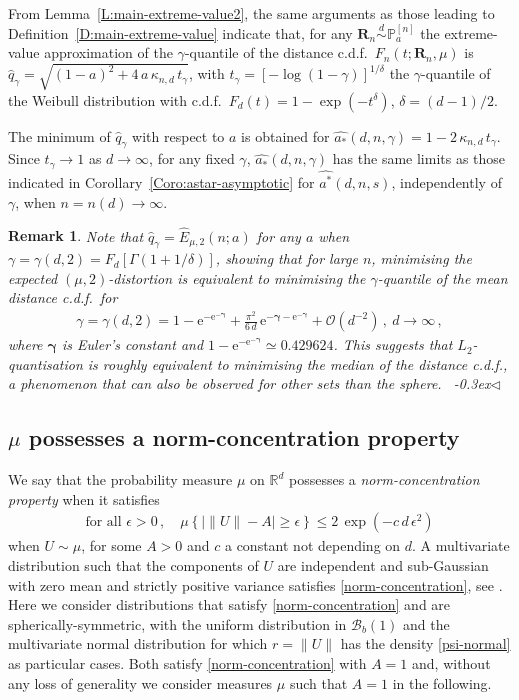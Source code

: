 \documentclass{article}
\def\mgbb{{\boldsymbol{\gamma}}}
\def\RR{\mathds{R}}
\def\simd{\stackrel{d}{\sim}}
\def\me{\epsilon}
\newcommand{\vsp} {\vspace{0.3cm}}
\def\PP{\mathbb{P}}
\def\SB{{\mathscr B}}
\newcommand{\bea}{\begin{eqnarray*}}
\newcommand{\eea}{\end{eqnarray*}}
\newcommand{\be}{\begin{eqnarray}}
\newcommand{\ee}{\end{eqnarray}}
\def\Rb{\mathbf{R}}
\def\mg{\gamma}
\def\e1{\mathrm{e}}
\newcommand{\fin} {\mbox{}~\hfill{\lower-0.3ex\hbox{$\triangleleft$}}}
\def\SO{{\mathcal O}}
\newtheorem{remark}{Remark}[section]
\begin{document}
\vsp
From Lemma~\ref{L:main-extreme-value2}, the same arguments as those leading to Definition~\ref{D:main-extreme-value} indicate that, for any $\Rb_n\simd \PP_a^{[n]}$ the extreme-value approximation of the $\mg$-quantile of the  distance c.d.f.\ $F_n(t; \Rb_n,\mu)$ is $\widehat q_\mg = \sqrt{(1-a)^2+4\,a\,\kappa_{n,d}\,t_\mg}$, with $t_\mg=[-\log(1-\mg)]^{1/\delta}$ the $\mg$-quantile of the Weibull distribution with c.d.f.\ $F_d(t)=1-\exp(-t^\delta)$, $\delta=(d-1)/2$.

The minimum of $\widehat q_\mg$ with respect to $a$ is obtained for $\widehat {a_*}(d,n,\mg)=1-2\,\kappa_{n,d}\,t_\mg$. Since $t_\mg\to 1$ as $d\to\infty$, for any fixed $\mg$, $\widehat {a_*}(d,n,\mg)$ has the same limits as those indicated in Corollary~\ref{Coro:astar-asymptotic} for $\widehat {a^*}(d,n,s)$, independently of $\mg$, when $n = n(d) \to \infty.$

\begin{remark}\label{R:quantiles} Note that $\widehat q_\mg = \widehat E_{\mu,2}(n;a)$ for any $a$ when $\mg=\mg(d,2)=F_d[\Gamma(1+1/\delta)]$, showing that for large $n$, minimising the expected $(\mu,2)$-distortion is equivalent to minimising the $\mg$-quantile of the mean distance c.d.f.\ for
\bea
\mg=\mg(d,2)=1- \e1^{-\e1^{-\mgbb}} + \frac{\pi^2}{6\,d}\, \e1^{-\mgbb-\e1^{-\mgbb}} +\SO(d^{-2})  \,, \ d\to\infty\,,
\eea
where $\mgbb$ is Euler's constant and $1- \e1^{-\e1^{-\mgbb}}\simeq 0.429624$. This suggests that $L_2$-quantisation is roughly equivalent to minimising the median of the distance c.d.f., a phenomenon that can also be observed for other sets than the sphere.
\fin
\end{remark}

\subsection{$\mu$ possesses a norm-concentration property} \label{S:extreme-value-general-mu}

We say that the probability measure  $\mu$ on $\RR^d$ possesses a {\em norm-concentration property} when it satisfies
\be\label{norm-concentration}
\mbox{for all } \me>0\,, \quad \mu\left\{\left| \|U\|-A \right| \geq \me\right\} \leq 2\,\exp(-c\, d\, \me^2)
\ee
when $U\sim\mu$, for some $A>0$ and $c$ a constant not depending on $d$. A multivariate distribution such that the components of $U$ are independent and sub-Gaussian with zero mean and strictly positive variance satisfies \eqref{norm-concentration}, see \cite[Th.~3.1.1]{Vershynin2018}. Here we consider distributions that satisfy \eqref{norm-concentration} and are spherically-symmetric, with the uniform distribution in $\SB_b(1)$ and the multivariate normal distribution for which $r=\|U\|$ has the density \eqref{psi-normal} as particular cases. Both satisfy \eqref{norm-concentration} with $A=1$ and, without any loss of generality we consider measures $\mu$ such that $A=1$ in the following.
\end{document}
